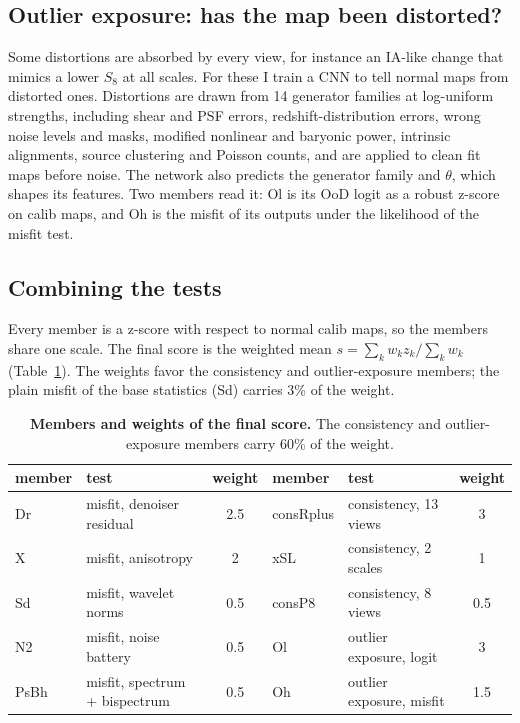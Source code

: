 \documentclass[10pt]{article}
\begin{document}
\subsection{Outlier exposure: has the map been distorted?}

Some distortions are absorbed by every view, for instance an IA-like change that mimics a lower $S_8$ at all scales.
For these I train a CNN to tell normal maps from distorted ones. Distortions are drawn from 14 generator families
at log-uniform strengths, including shear and PSF errors, redshift-distribution errors, wrong noise levels and
masks, modified nonlinear and baryonic power, intrinsic alignments, source clustering and Poisson counts, and are
applied to clean fit maps before noise. The network also predicts the generator family and $\theta$, which shapes its features. Two members read it:
Ol is its OoD logit as a robust z-score on calib maps, and Oh is the misfit of its outputs under the likelihood
of the misfit test.

\subsection{Combining the tests}

Every member is a z-score with respect to normal calib maps, so the members share one scale. The final score is
the weighted mean $s=\sum_k w_k z_k / \sum_k w_k$ (Table~\ref{tab:weights}). The weights favor the consistency and
outlier-exposure members; the plain misfit of the base statistics (Sd) carries 3\% of the weight.

\begin{table}[t]
\centering\small
\begin{tabular}{llc@{\hspace{2.5em}}llc}
\toprule
member & test & weight & member & test & weight\\
\midrule
Dr   & misfit, denoiser residual     & 2.5 & consRplus & consistency, 13 views    & 3\\
X    & misfit, anisotropy            & 2   & xSL       & consistency, 2 scales    & 1\\
Sd   & misfit, wavelet norms         & 0.5 & consP8    & consistency, 8 views     & 0.5\\
N2   & misfit, noise battery         & 0.5 & Ol        & outlier exposure, logit  & 3\\
PsBh & misfit, spectrum + bispectrum & 0.5 & Oh        & outlier exposure, misfit & 1.5\\
\bottomrule
\end{tabular}
\caption{\textbf{Members and weights of the final score.} The consistency and outlier-exposure members carry 60\%
of the weight.}
\label{tab:weights}
\end{table}
\end{document}
